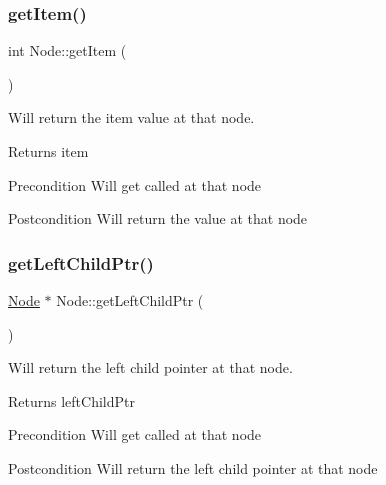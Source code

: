 \subsubsection{\texorpdfstring{get\+Item()}{getItem()}}
{\footnotesize\ttfamily int Node\+::get\+Item (\begin{DoxyParamCaption}{ }\end{DoxyParamCaption})}



Will return the item value at that node. 

\begin{DoxyReturn}{Returns}
item 
\end{DoxyReturn}
\begin{DoxyPrecond}{Precondition}
Will get called at that node 
\end{DoxyPrecond}
\begin{DoxyPostcond}{Postcondition}
Will return the value at that node 
\end{DoxyPostcond}
\mbox{\label{class_node_a81c225637a0cc1edd73c2aba18ea6f4a}} 
\subsubsection{\texorpdfstring{get\+Left\+Child\+Ptr()}{getLeftChildPtr()}}
{\footnotesize\ttfamily \mbox{\hyperlink{class_node}{Node}} $\ast$ Node\+::get\+Left\+Child\+Ptr (\begin{DoxyParamCaption}{ }\end{DoxyParamCaption})}



Will return the left child pointer at that node. 

\begin{DoxyReturn}{Returns}
left\+Child\+Ptr 
\end{DoxyReturn}
\begin{DoxyPrecond}{Precondition}
Will get called at that node 
\end{DoxyPrecond}
\begin{DoxyPostcond}{Postcondition}
Will return the left child pointer at that node 
\end{DoxyPostcond}
\mbox{\label{class_node_a9f9db183586c193a33627e239b1cdab5}} 

